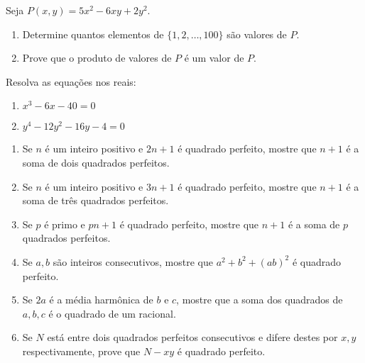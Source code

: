 \begin{questao}
  Seja $P(x,y) = 5x^2-6xy+2y^2$.

  \begin{enumerate}

  \item Determine quantos elementos de $\{1,2,\ldots,100\}$ são valores de $P$.

  \item Prove que o produto de valores de $P$ é um valor de $P$.
  \end{enumerate}

\end{questao}

\begin{questao}
  Resolva as equações nos reais:

  \begin{enumerate}

  \item $x^3-6x-40 = 0$

  \item $y^4-12y^2-16y-4 = 0$
  \end{enumerate}

\end{questao}

\begin{questao}

  \begin{enumerate}

  \item Se $n$ é um inteiro positivo e $2n+1$ é quadrado perfeito, mostre que
    $n+1$ é a soma de dois quadrados perfeitos.

  \item Se $n$ é um inteiro positivo e $3n+1$ é quadrado perfeito, mostre que
    $n+1$ é a soma de três quadrados perfeitos.

  \item Se $p$ é primo e $pn+1$ é quadrado perfeito, mostre que $n+1$ é a soma
    de $p$ quadrados perfeitos.

  \item Se $a,b$ são inteiros consecutivos, mostre que $a^2+b^2+(ab)^2$ é
    quadrado perfeito.

  \item Se $2a$ é a média harmônica de $b$ e $c$, mostre que a soma dos
    quadrados de $a,b,c$ é o quadrado de um racional.

  \item Se $N$ está entre dois quadrados perfeitos consecutivos e difere destes
    por $x,y$ respectivamente, prove que $N-xy$ é quadrado perfeito.
  \end{enumerate}

\end{questao}


